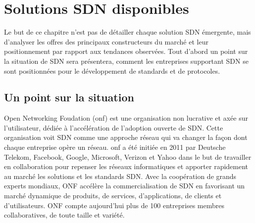 \chapter{Solutions SDN disponibles}

Le but de ce chapitre n'est pas de détailler chaque solution SDN émergente, mais d'analyser les offres des principaux constructeurs du marché et leur positionnement par rapport aux tendances observées.
Tout d'abord un point sur la situation de SDN sera présentera, comment les entreprises supportant SDN se sont positionnées pour le développement de standards et de protocoles.




\section{Un point sur la situation}




Open Networking Foudation (\gls{onf}) est une organisation non lucrative et axée sur l'utilisateur, dédiée à l'accélération de l'adoption ouverte de SDN. Cette organisation voit SDN comme une approche réseau qui va changer la façon dont chaque entreprise opère un réseau.
\gls{onf} a été initiée en 2011 par Deutsche Telekom, Facebook, Google, Microsoft, Verizon et Yahoo dans le but de travailler en collaboration pour repenser les réseaux informatiques et apporter rapidement au marché les solutions et les standards SDN. Avec la coopération de grands experts mondiaux, ONF accélère la commercialisation de SDN en favorisant un  marché dynamique de produits, de services, d'applications, de clients et d'utilisateurs. ONF compte aujourd'hui plus de 100 entreprises membres collaboratives, de toute taille et variété. \cite{ONFOverview}

